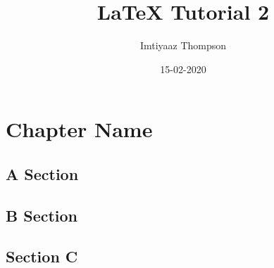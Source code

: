 \documentclass[a4paper,12pt]{book}
\begin{document}
\title{\Large{\textbf{LaTeX Tutorial 2}}}
\author{Imtiyaaz Thompson}
\date{15-02-2020}
\maketitle

\tableofcontents
{}
\setcounter{page}{2}

\fancyhf{}
\renewcommand{\headrulewidth}{2pt}
\renewcommand{\footrulewidth}{2pt}
\fancyhead[LE]{\leftmark} %
\fancyhead[RO]{\nouppercase{\rightmark}}
\fancyfoot[LE,RO]{\thepage} %

\chapter{Chapter Name}

\blindmathtrue
\blindtext[5]

\section{A Section}

\section{B Section}

\section{Section C}
\end{document}
